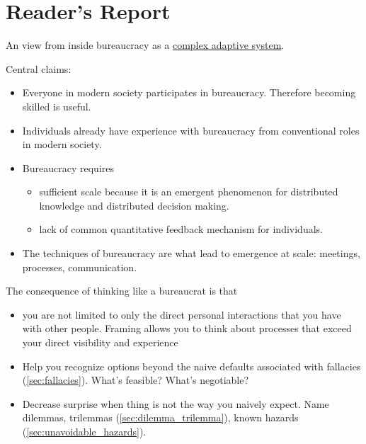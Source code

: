 \chapter{Reader's Report\label{sec:reader_report}}
An view from inside bureaucracy as a \href{https://en.wikipedia.org/wiki/Complexity_theory_and_organizations}{complex adaptive system}. 

Central claims:
\begin{itemize}
    \item Everyone in modern society participates in bureaucracy. Therefore becoming skilled is useful.
    \item Individuals already have experience with bureaucracy from conventional roles in modern society. 
    \item Bureaucracy requires 
    \begin{itemize}
        \item sufficient scale because it is an emergent phenomenon for distributed knowledge and distributed decision making. 
        \item lack of common quantitative feedback mechanism for individuals.
    \end{itemize}
    \item The techniques of bureaucracy are what lead to emergence at scale: meetings, processes, communication. 
\end{itemize}
The consequence of thinking like a bureaucrat is that
\begin{itemize}
    \item you are not limited to only the direct personal interactions that you have with other people. Framing allows you to think about processes that exceed your direct visibility and experience
    \item Help you recognize options beyond the naive defaults associated with fallacies (\ref{sec:fallacies}). What's feasible? What's negotiable?
    \item Decrease surprise when thing is not the way you naively expect. Name dilemmas, trilemmas (\ref{sec:dilemma_trilemma}), known hazards (\ref{sec:unavoidable_hazards}).
\end{itemize}
